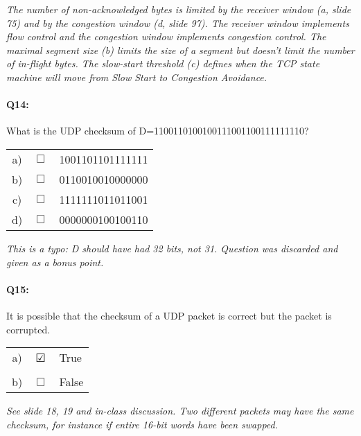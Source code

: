 \documentclass{llncs}
\newcommand{\answer}[1]{{\color{red}\textit{#1}\color{black}}}
\begin{document}
\answer{The number of non-acknowledged bytes is limited by the
  receiver window (a, slide 75) and by the congestion window (d, slide
  97). The receiver window implements flow control and the congestion
  window implements congestion control. The maximal segment size (b)
  limits the size of a segment but doesn't limit the number of
  in-flight bytes. The slow-start threshold (c) defines when the TCP
  state machine will move from Slow Start to Congestion Avoidance.}

\paragraph{\textbf{Q14:}}
What is the UDP checksum of D=1100110100100111001100111111110?

\begin{tabular}{ccl}
  a) & $\Box$ & 1001101101111111
  \\
  b) & $\Box$ & 0110010010000000
  \\
  c) & $\Box$ & 1111111011011001
  \\
  d) & $\Box$ & 0000000100100110
\end{tabular}

\answer{This is a typo: D should have had 32 bits, not 31. Question
  was discarded and given as a bonus point.}

\paragraph{\textbf{Q15:}}

It is possible that the checksum of a UDP packet is correct but the packet is corrupted.

\begin{tabular}{ccl}
  a) & $\CheckedBox$ & True\\
  \\
  b) & $\Box$ & False
\end{tabular}

\answer{See slide 18, 19 and in-class discussion. Two different
  packets may have the same checksum, for instance if entire 16-bit
  words have been swapped.}
\end{document}
